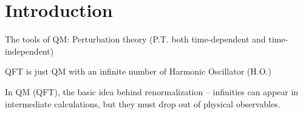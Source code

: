 \section{Introduction}

The tools of QM: Perturbation theory (P.T. both time-dependent and time-independent)

QFT is just QM with an infinite number of Harmonic Oscillator (H.O.)

In QM (QFT), the basic idea behind renormalization -- infinities can appear in intermediate
calculations, but they must drop out of physical observables.
